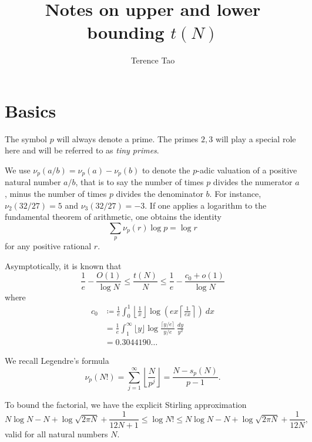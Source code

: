 \documentclass[12pt,a4paper,reqno]{amsart}
\numberwithin{equation}{section}
\theoremstyle{plain}
\theoremstyle{definition}
\begin{document}
\title{Notes on upper and lower bounding $t(N)$}

\author{Terence Tao}
\maketitle


\section{Basics}

The symbol $p$ will always denote a prime.  The primes $2,3$ will play a special role here and will be referred to as \emph{tiny primes}.

We use $\nu_p(a/b) = \nu_p(a)-\nu_p(b)$ to denote the $p$-adic valuation of a positive natural number $a/b$, that is to say the number of times $p$ divides the numerator $a$, minus the number of times $p$ divides the denominator $b$.  For instance, $\nu_2(32/27)=5$ and $\nu_3(32/27)=-3$. 
If one applies a logarithm to the fundamental theorem of arithmetic, one obtains the identity
\begin{equation}\label{ftoa}
  \sum_p \nu_p(r) \log p = \log r
\end{equation}
for any positive rational $r$.

Asymptotically, it is known that
$$ \frac{1}{e} - \frac{O(1)}{\log N} \leq \frac{t(N)}{N} \leq \frac{1}{e} - \frac{c_0+o(1)}{\log N}$$
where
  \begin{equation}\label{c0-def}
    \begin{split}
    c_0 &\coloneqq \frac{1}{e} \int_0^1 \left \lfloor \frac{1}{x} \right\rfloor \log \left( ex \left \lceil \frac{1}{ex} \right\rceil \right)\ dx \\
    &= \frac{1}{e} \int_1^\infty \lfloor y \rfloor \log \frac{\lceil y/e \rceil}{y/e}\ \frac{dy}{y^2} \\
    &= 0.3044190\dots
    \end{split}
  \end{equation}

We recall Legendre's formula
\begin{equation}\label{legendre}
  \nu_p(N!) = \sum_{j=1}^\infty \left\lfloor \frac{N}{p^j} \right\rfloor = \frac{N - s_p(N)}{p-1}.
\end{equation}


To bound the factorial, we have the explicit Stirling approximation \cite{robbins}
\begin{equation}\label{stirling}
  N \log N - N + \log \sqrt{2\pi N} + \frac{1}{12N+1} \leq \log N! \leq N \log N - N + \log \sqrt{2\pi N} + \frac{1}{12N},
\end{equation}
valid for all natural numbers $N$. 
\end{document}
